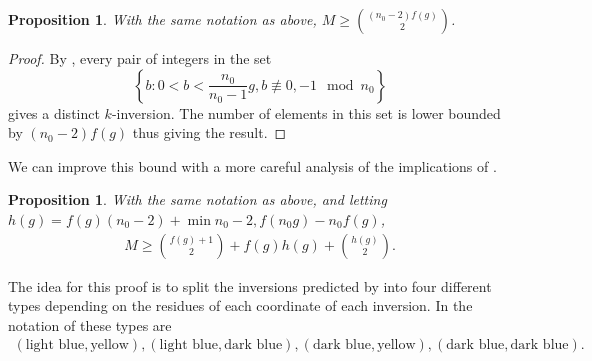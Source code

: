 \documentclass[11pt]{article}
\newtheorem{prop}[theo]{Proposition}
\theoremstyle{definition}
\numberwithin{equation}{section}
\newcommand{\set}[1]{\left\{{#1}\right\}}
\begin{document}
\begin{prop}
    With the same notation as above, $M \geq \binom{(n_0-2)f(g)}{2}$.
\end{prop}

\begin{proof}
    By , every pair of integers in the set $$\set{b:0<b<\frac{n_0}{n_0-1}g, b \not \equiv 0,-1\mod n_0}$$ gives a distinct $k$-inversion. The number of elements in this set is lower bounded by $(n_0-2)f(g)$ thus giving the result.
\end{proof}

We can improve this bound with a more careful analysis of the implications of .

\begin{prop}\label{prop-oneOffNotGeneral}
    With the same notation as above, and letting $h(g) = f(g)(n_0-2) + \min{n_0-2,f(n_0g)-n_0f(g)}$,
    \begin{align*}
        M \geq \binom{f(g)+1}{2} + f(g)h(g) + \binom{h(g)}{2}.
    \end{align*}
\end{prop}

The idea for this proof is to split the inversions predicted by  into four different types depending on the residues of each coordinate of each inversion. In the notation of  these types are 
\begin{align*}
    (\text{light blue}, \text{yellow}),(\text{light blue}, \text{dark blue}),(\text{dark blue}, \text{yellow}),(\text{dark blue}, \text{dark blue}). 
\end{align*}
\end{document}
